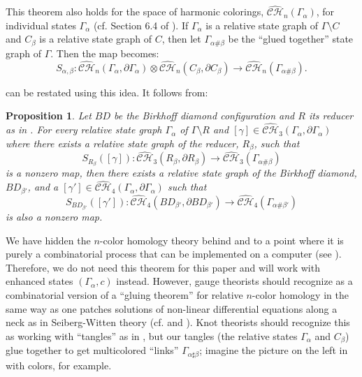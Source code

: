 \documentclass[12pt]{amsart}
\newtheorem{proposition}[theorem]{Proposition}
\theoremstyle{definition}
\theoremstyle{remark}
\numberwithin{equation}{section}
\newcommand{\ot}{\otimes}
\newcommand{\ra}{\rightarrow}
\begin{document}
This theorem also holds for the space of harmonic colorings, $\widehat{\mathcal{CH}}_n(\Gamma_\alpha)$, for individual states $\Gamma_\alpha$ (cf. Section 6.4 of \cite{BMcC}). If $\Gamma_\alpha$ is a relative state graph of $\Gamma\setminus C$ and $C_\beta$ is a relative state graph of $C$, then let $\Gamma_{\alpha \# \beta}$ be the ``glued together'' state graph of $\Gamma$. Then the map becomes:
$$S_{{\alpha,\beta}}:\widehat{\mathcal{CH}}_n(\Gamma_\alpha, \partial \Gamma_\alpha ) \ot \widehat{\mathcal{CH}}_n(C_\beta, \partial C_\beta) \ra \widehat{\mathcal{CH}}_n(\Gamma_{\alpha \# \beta}).$$

 can be restated using this idea. It follows from: 


\begin{proposition}
Let $BD$ be the Birkhoff diamond configuration and $R$ its reducer as in .  For every relative state graph $\Gamma_\alpha$  of $\Gamma\setminus R$ and  $[\gamma]\in \widehat{\mathcal{CH}}_3(\Gamma_\alpha, \partial \Gamma_\alpha ) $ where  there exists a  relative state graph of the reducer, $R_\beta$, such that 
$$S_{R_\beta}([\gamma]): \widehat{\mathcal{CH}}_3(R_\beta, \partial R_\beta)  \ra  \widehat{\mathcal{CH}}_3(\Gamma_{\alpha \# \beta})$$
is a nonzero map, then there exists a relative state graph of the Birkhoff diamond, $BD_{\beta'}$, and a  $[\gamma'] \in\widehat{\mathcal{CH}}_4(\Gamma_\alpha, \partial \Gamma_\alpha)$ such that
$$S_{BD_{\beta'}}([\gamma']): \widehat{\mathcal{CH}}_4(BD_{\beta'}, \partial BD_{\beta'})  \ra  \widehat{\mathcal{CH}}_4(\Gamma_{\alpha \# \beta'})$$
is also a nonzero map.
\label{proposition:gluing-extension}
\end{proposition}

We have hidden the $n$-color homology theory behind  and  to a point where it is purely a combinatorial process that can be  implemented on a computer (see ). Therefore, we do not need this theorem for this paper and will work with enhanced states $(\Gamma_\alpha, c)$ instead. However,  gauge theorists should recognize  as a combinatorial version of a ``gluing theorem'' for relative $n$-color homology in the same way as one patches solutions of non-linear differential equations along a neck as in Seiberg-Witten theory  (cf. \cite{MST} and \cite{MMS}). Knot theorists should recognize this as working with  ``tangles'' as in  \cite{BN3}, but our tangles (the relative states $\Gamma_\alpha$ and $C_\beta$) glue together to get multicolored ``links'' $\Gamma_{\alpha\sharp\beta}$; imagine the picture on the left in  with colors, for example. 
\end{document}

